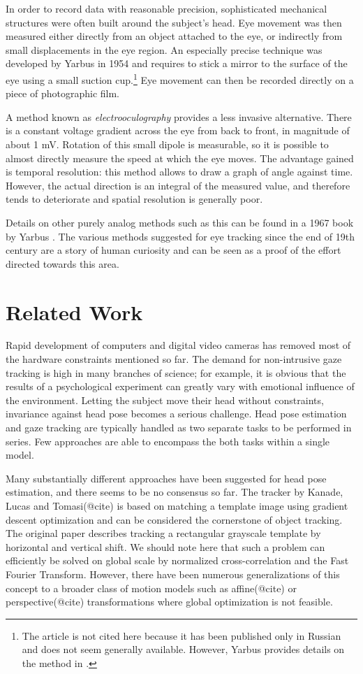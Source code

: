 In order to record data with reasonable precision, sophisticated mechanical structures were often built around the subject's head.
Eye movement was then measured either directly from an object attached to the eye, or indirectly from small displacements in the eye region.
An especially precise technique was developed by Yarbus in 1954 and requires to stick a mirror to the surface of the eye using a small suction cup.\footnote{
The article is not cited here because it has been published only in Russian and does not seem generally available.
However, Yarbus provides details on the method in \cite{yarbus1967}.
}
Eye movement can then be recorded directly on a piece of photographic film.

A method known as \textit{electrooculography} provides a less invasive alternative.
There is a constant voltage gradient across the eye from back to front, in magnitude of about 1 mV.
Rotation of this small dipole is measurable, so it is possible to almost directly measure the speed at which the eye moves.
The advantage gained is temporal resolution: this method allows to draw a graph of angle against time.
However, the actual direction is an integral of the measured value, and therefore tends to deteriorate and spatial resolution is generally poor.

Details on other purely analog methods such as this can be found in a 1967 book by Yarbus \cite{yarbus1967}.
The various methods suggested for eye tracking since the end of 19th century are a story of human curiosity and can be seen as a proof of the effort directed towards this area.

\section{Related Work}

Rapid development of computers and digital video cameras has removed most of the hardware constraints mentioned so far.
The demand for non-intrusive gaze tracking is high in many branches of science; for example, it is obvious that the results of a psychological experiment can greatly vary with emotional influence of the environment.
Letting the subject move their head without constraints, invariance against head pose becomes a serious challenge.
Head pose estimation and gaze tracking are typically handled as two separate tasks to be performed in series.
Few approaches are able to encompass the both tasks within a single model.

Many substantially different approaches have been suggested for head pose estimation, and there seems to be no consensus so far.
The tracker by Kanade, Lucas and Tomasi(@cite) is based on matching a template image using gradient descent optimization and can be considered the cornerstone of object tracking.
The original paper describes tracking a rectangular grayscale template by horizontal and vertical shift.
We should note here that such a problem can efficiently be solved on global scale by normalized cross-correlation and the Fast Fourier Transform.
However, there have been numerous generalizations of this concept to a broader class of motion models such as affine(@cite) or perspective(@cite) transformations where global optimization is not feasible.


